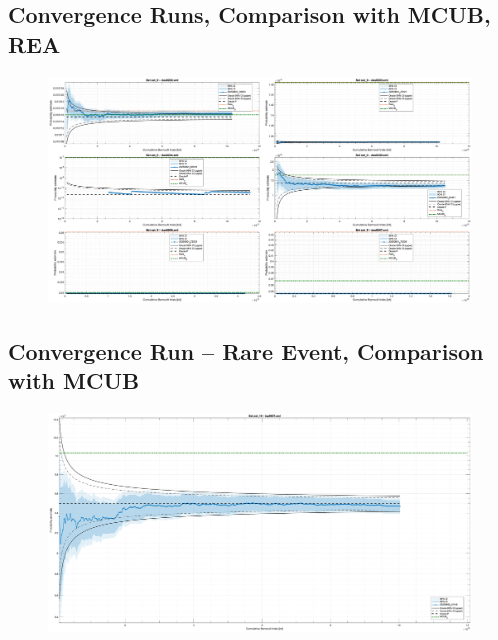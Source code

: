 \subsection{Convergence Runs, Comparison with MCUB, REA}
\begin{frame}
\begin{figure}[p]
    \centering
    \includegraphics[height=1\textheight]{4_casestudy/conv_figeps.eps}
    \label{fig:convergence_run_01}
\end{figure}
\end{frame}

\subsection{Convergence Run -- Rare Event, Comparison with MCUB}
\begin{frame}
\begin{figure}[p]
    \centering
    \includegraphics[height=0.9\textheight]{4_casestudy/conv_ips9607.eps}
    \label{fig:convergence_run_01}
\end{figure}
\end{frame}

